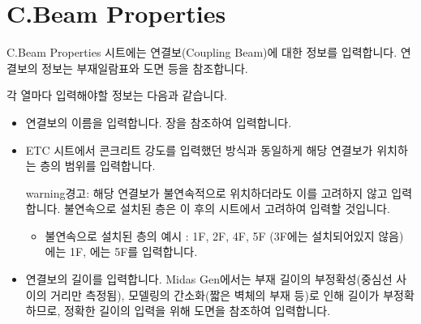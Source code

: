 \documentclass[a4paper,11pt,korean,openany,oneside]{sphinxmanual}
\begin{document}
\section{C.Beam Properties}
\label{\detokenize{2_c_beam_properties:c-beam-properties}}\label{\detokenize{2_c_beam_properties::doc}}
\sphinxAtStartPar
C.Beam Properties 시트에는 연결보(Coupling Beam)에 대한 정보를 입력합니다.
연결보의 정보는 부재일람표와 도면 등을 참조합니다.

\sphinxAtStartPar
각 열마다 입력해야할 정보는 다음과 같습니다.
\begin{itemize}
\item {} \begin{description}
\sphinxAtStartPar
연결보의 이름을 입력합니다. {\hyperref[\detokenize{2_naming_rules::doc}]{}} 장을 참조하여 입력합니다.

\end{description}

\item {} \begin{description}
\sphinxAtStartPar
ETC 시트에서 콘크리트 강도를 입력했던 방식과 동일하게 해당 연결보가 위치하는 층의 범위를 입력합니다.

\begin{sphinxadmonition}{warning}{경고:}
\sphinxAtStartPar
해당 연결보가 불연속적으로 위치하더라도 이를 고려하지 않고 입력합니다.
불연속으로 설치된 층은 이 후의 시트에서 고려하여 입력할 것입니다.
\begin{itemize}
\item {} 
\sphinxAtStartPar
불연속으로 설치된 층의 예시 : 1F, 2F, 4F, 5F (3F에는 설치되어있지 않음)
에는 1F, 에는 5F를 입력합니다.

\end{itemize}
\end{sphinxadmonition}

\end{description}

\item {} \begin{description}
\sphinxAtStartPar
연결보의 길이를 입력합니다.
Midas Gen에서는 부재 길이의 부정확성(중심선 사이의 거리만 측정됨),
모델링의 간소화(짧은 벽체의 부재 등)로 인해 길이가 부정확하므로,
정확한 길이의 입력을 위해 도면을 참조하여 입력합니다.


\end{description}
\end{itemize}
\end{document}
